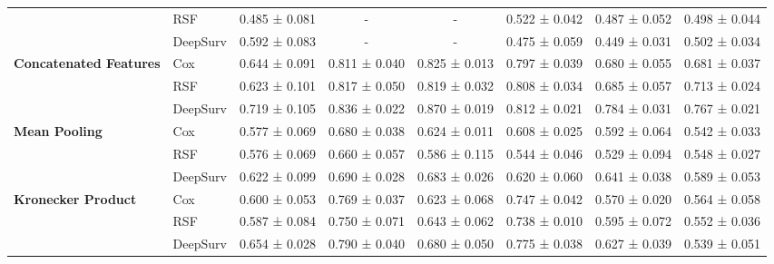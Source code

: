 \begin{sidewaystable}[htbp]
\begin{tabular}{@{}llcccccc@{}}
        & RSF & 0.485 ± 0.081 & - & - & 0.522 ± 0.042 & 0.487 ± 0.052 & 0.498 ± 0.044 \\
        & DeepSurv & 0.592 ± 0.083 & - & - & 0.475 ± 0.059 & 0.449 ± 0.031 & 0.502 ± 0.034 \\
        \midrule
        \multirow{3}{*}{\textbf{Concatenated Features}} & Cox & 0.644 ± 0.091 & 0.811 ± 0.040 & 0.825 ± 0.013 & 0.797 ± 0.039 & 0.680 ± 0.055 & 0.681 ± 0.037 \\
        & RSF & 0.623 ± 0.101 & 0.817 ± 0.050 & 0.819 ± 0.032 & 0.808 ± 0.034 & 0.685 ± 0.057 & 0.713 ± 0.024 \\
        & DeepSurv & 0.719 ± 0.105 & 0.836 ± 0.022 & 0.870 ± 0.019 & 0.812 ± 0.021 & 0.784 ± 0.031 & 0.767 ± 0.021 \\
        \midrule
        \multirow{3}{*}{\textbf{Mean Pooling}} & Cox & 0.577 ± 0.069 & 0.680 ± 0.038 & 0.624 ± 0.011 & 0.608 ± 0.025 & 0.592 ± 0.064 & 0.542 ± 0.033 \\
        & RSF & 0.576 ± 0.069 & 0.660 ± 0.057 & 0.586 ± 0.115 & 0.544 ± 0.046 & 0.529 ± 0.094 & 0.548 ± 0.027 \\
        & DeepSurv & 0.622 ± 0.099 & 0.690 ± 0.028 & 0.683 ± 0.026 & 0.620 ± 0.060 & 0.641 ± 0.038 & 0.589 ± 0.053 \\
        \midrule
        \multirow{3}{*}{\textbf{Kronecker Product}} & Cox & 0.600 ± 0.053 & 0.769 ± 0.037 & 0.623 ± 0.068 & 0.747 ± 0.042 & 0.570 ± 0.020 & 0.564 ± 0.058 \\
        & RSF & 0.587 ± 0.084 & 0.750 ± 0.071 & 0.643 ± 0.062 & 0.738 ± 0.010 & 0.595 ± 0.072 & 0.552 ± 0.036 \\
        & DeepSurv & 0.654 ± 0.028 & 0.790 ± 0.040 & 0.680 ± 0.050 & 0.775 ± 0.038 & 0.627 ± 0.039 & 0.539 ± 0.051 \\
        \bottomrule
    \end{tabular}
\end{sidewaystable}

